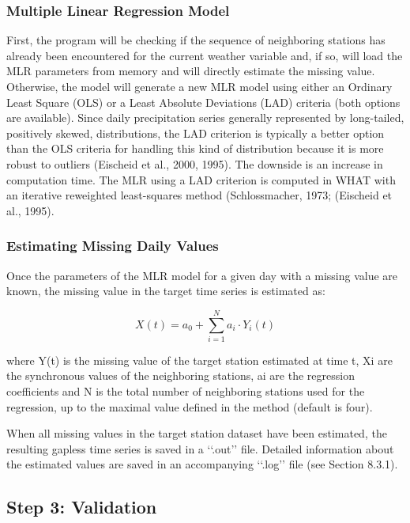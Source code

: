 \documentclass[ARTICLETHERMIC.tex]{subfiles}
\begin{document}
\subsubsection{Multiple Linear Regression Model}
First, the program will be checking if the sequence of neighboring stations has already been encountered for the current weather variable and, if so, will load the MLR parameters from memory and will directly estimate the missing value. Otherwise, the model will generate a new MLR model using either an Ordinary Least Square (OLS) or a Least Absolute Deviations (LAD) criteria (both options are available). Since daily precipitation series generally represented by long-tailed, positively skewed, distributions, the LAD criterion is typically a better option than the OLS criteria for handling this kind of distribution because it is more robust to outliers (Eischeid et al., 2000, 1995). The downside is an increase in computation time. The MLR using a LAD criterion is computed in WHAT with an iterative reweighted least-squares method (Schlossmacher, 1973; (Eischeid et al., 1995).


\subsubsection{Estimating Missing Daily Values}

Once the parameters of the MLR model for a given day with a missing value are known, the missing value in the target time series is estimated as:

\begin{equation}
    X(t) = a_0 + \sum_{i=1}^{N} a_i \cdot Y_i(t)
\end{equation}

where Y(t) is the missing value of the target station estimated at time t, Xi are the synchronous values of the neighboring stations, ai are the regression coefficients and N is the total number of neighboring stations used for the regression, up to the maximal value defined in the method (default is four).

When all missing values in the target station dataset have been estimated, the resulting gapless time series is saved in a ‘‘.out’’ file. Detailed information about the estimated values are saved in an accompanying ‘‘.log’’ file (see Section 8.3.1).

\subsection{Step 3: Validation}
\end{document}
